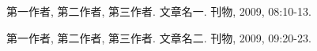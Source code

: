 \begin{publications}{2} %
    \item 第一作者, 第二作者, 第三作者.
        文章名一.
        刊物, 2009, 08:10-13.
    \item 第一作者, 第二作者, 第三作者.
        文章名二.
        刊物, 2009, 09:20-23.

\end{publications}
